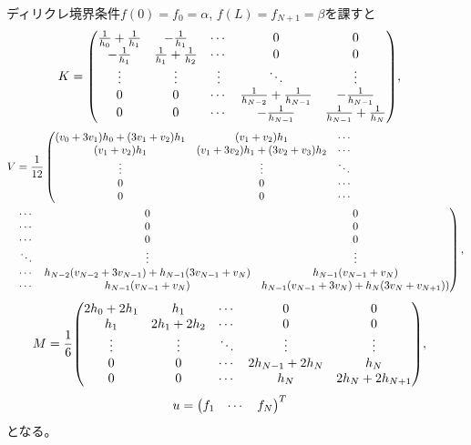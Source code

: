 \documentclass[xelatex,ja=standard]{bxjsarticle}
\begin{document}
ディリクレ境界条件$f(0) = f_0 = \alpha$, $f(L) = f_{N+1} = \beta$を課すと
\begin{align}
    K&=
     \mqty(
     \frac{1}{h_0} + \frac{1}{h_1} & -\frac{1}{h_1} & \cdots & 0 & 0\\
     -\frac{1}{h_1} & \frac{1}{h_1} + \frac{1}{h_2} & \cdots & 0 & 0\\
     \vdots & \vdots & \vdots & \ddots & \vdots\\
     0 & 0 & \cdots & \frac{1}{h_{N-2}} + \frac{1}{h_{N-1}} & -\frac{1}{h_{N-1}} \\
     0 & 0 & \cdots & -\frac{1}{h_{N-1}} &\frac{1}{h_{N-1}} + \frac{1}{h_N} \\
     ),
\end{align}
\begin{align}
     V&= \frac{1}{12}\left(\mqty{
        \qty(v_{0} + 3v_{1})h_0 + \qty(3v_{1} +v_{2})h_1 & \qty(v_{1} +v_{2})h_1 & \cdots\\
        \qty(v_{1} +v_{2})h_1 & \qty(v_{1} + 3v_{2})h_1 + \qty(3v_{2} + v_{3})h_2 & \cdots\\
        \vdots & \vdots & \ddots\\
        0 & 0 & \cdots\\
        0 & 0 & \cdots\\
        }\right.\notag\\
     &  \left.\mqty{
        \cdots  & 0 & 0\\
        \cdots & 0 & 0\\
        \cdots& 0 & 0\\
        \ddots  & \vdots& \vdots\\
        \cdots & h_{N-2}\qty(v_{N-2} + 3v_{N-1}) + h_{N-1}\qty(3v_{N-1} + v_{N})& h_{N-1}\qty(v_{N - 1} +v_{N})\\
        \cdots & h_{N-1}\qty(v_{N - 1} +v_{N})& h_{N-1}\qty(v_{N-1} + 3v_{N}) + h_N\qty(3v_{N} + v_{N +1})) \\
        }\right),
\end{align}
\begin{align}
    M&=
     \frac{1}{6}\mqty(
     2h_0 + 2h_1 & h_1 & \cdots & 0 & 0\\
     h_1 & 2h_1 + 2h_2 & \cdots & 0 & 0\\
     \vdots & \vdots & \ddots & \vdots  & \vdots\\
     0 & 0 & \cdots & 2h_{N - 1} + 2h_{N} & h_N\\
     0 & 0 & \cdots & h_N & 2h_{N} + 2h_{N+1} \\
     ),
\end{align}
\begin{align}
    u&=\mqty(f_1 & \cdots & f_N)^T
\end{align}
となる。
\end{document}
